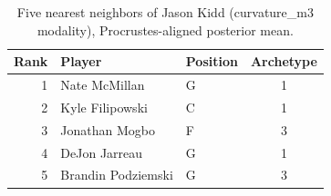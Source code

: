\begin{table}[htbp]
  \centering\small
  \begin{tabular}{rllc}
    \toprule
    Rank & Player & Position & Archetype \\
    \midrule
    1 & Nate McMillan & G & 1 \\
    2 & Kyle Filipowski & C & 1 \\
    3 & Jonathan Mogbo & F & 3 \\
    4 & DeJon Jarreau & G & 1 \\
    5 & Brandin Podziemski & G & 3 \\
    \bottomrule
  \end{tabular}
  \caption{Five nearest neighbors of Jason Kidd (curvature_m3 modality), Procrustes-aligned posterior mean.}
  \label{tab:Jason_Kidd_neighbors_curvature_m3}
\end{table}

